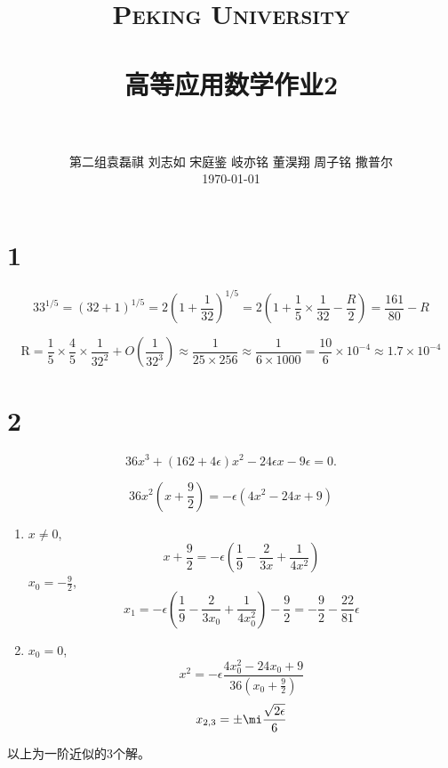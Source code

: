 \documentclass[12pt]{article}
\title{
		\vspace{-1in} 	
		\usefont{OT1}{bch}{b}{n}
		\normalfont \normalsize \textsc{\LARGE Peking University}\\[1cm] %
		\horrule{0.5pt} \\[0.5cm]
		\huge \bfseries{高等应用数学作业2} \\
		\horrule{2pt} \\[0.5cm]
}
\author{
		\normalfont 								\normalsize
		第二组\quad 袁磊祺 \quad 刘志如 \quad 宋庭鉴 \quad 岐亦铭 \quad 董淏翔 \quad 周子铭 \quad 撒普尔\\	\normalsize
        \today
}
\date{}
\begin{document}


\maketitle

\section{1}

\begin{equation}
	33^{1 / 5}=(32+1)^{1 / 5}=2\left(1+\frac{1}{32}\right)^{1 / 5}=2\left(1+\frac{1}{5} \times \frac{1}{32}-\frac{R}{2}\right)=\frac{161}{80}-R
\end{equation}

\begin{equation}
	\mathrm{R}=\frac{1}{5} \times \frac{4}{5} \times \frac{1}{32^{2}}+O\left(\frac{1}{32^{3}}\right) \approx \frac{1}{25 \times 256} \approx \frac{1}{6 \times 1000}=\frac{10}{6} \times 10^{-4} \approx 1.7 \times 10^{-4}
\end{equation}

\section{2}

\begin{equation}
	36x^3 + (162 + 4\epsilon)x^2-24\epsilon x - 9\epsilon = 0.
\end{equation}

\begin{equation}
	36x^2\left(x + \frac{9}{2}\right) = - \epsilon (4x^2 - 24x + 9)
\end{equation}

\begin{enumerate}
	\item $x\not= 0$,
	\begin{equation}
		x + \frac{9}{2} = - \epsilon\left(\frac{1}{9}-\frac{2}{3x}+\frac{1}{4x^2}\right)
	\end{equation}
	$x_0 = -\frac{9}{2}$,
	\begin{equation}
		x_1 = -\epsilon\left(\frac{1}{9}-\frac{2}{3x_0}+\frac{1}{4x_0^2}\right) - \frac{9}{2} = - \frac{9}{2} - \frac{22}{81} \epsilon
	\end{equation}
	\item $x_0 = 0$,
	\begin{equation}
		x^2 = -\epsilon \frac{4x_0^2-24x_0+9}{36\left(x_0+\frac{9}{2}\right) }
	\end{equation}
	\begin{equation}
		x_{2,3} = \pm \mi \frac{\sqrt{2\epsilon}}{6}
	\end{equation}
\end{enumerate}
以上为一阶近似的3个解。
\end{document}
